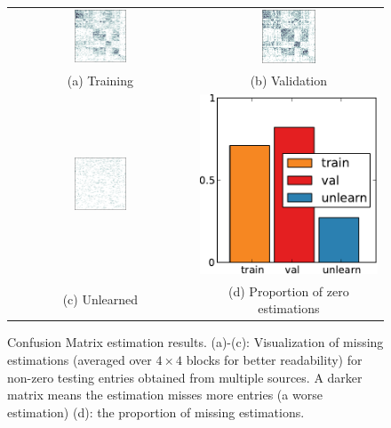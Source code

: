 \begin{figure}
  \centering
  \begin{tabular}{cc}
    \includegraphics[width=0.3\textwidth]{figs/taskadaptation/confmat_trainz.pdf} &
    \includegraphics[width=0.3\textwidth]{figs/taskadaptation/confmat_valz.pdf} \\
    (a) Training & (b) Validation \\
    \includegraphics[width=0.3\textwidth]{figs/taskadaptation/confmat_approxz.pdf} &
    \includegraphics[height=0.3\textwidth]{figs/taskadaptation/confmat_zero_hist.pdf}\\
    (c) Unlearned & (d) Proportion of zero estimations\\
  \end{tabular}
  \caption{Confusion Matrix estimation results. (a)-(c): Visualization of missing estimations (averaged over $4\times4$ blocks for better readability) for non-zero testing entries obtained from multiple sources. A darker matrix means the estimation misses more entries (a worse estimation) (d): the proportion of missing estimations.}\label{fig:conftable}
\end{figure}

